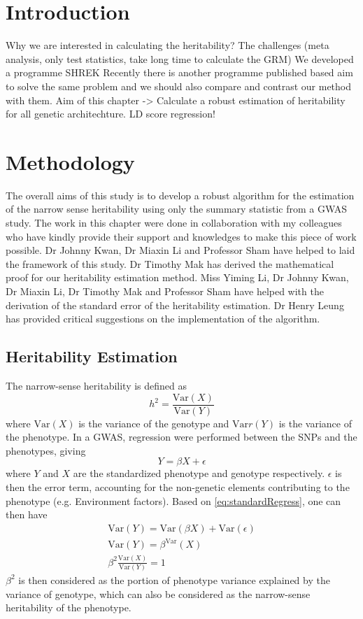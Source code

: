 	\section{Introduction}
	Why we are interested in calculating the heritability?
	The challenges (meta analysis, only test statistics, take long time to calculate the GRM)
	We developed a programme SHREK
	Recently there is another programme published based aim to solve the same problem and we should also compare and contrast our method with them.  %
	Aim of this chapter -> Calculate a robust estimation of heritability for all genetic architechture. 
	LD score regression!
	\section{Methodology}	
		The overall aims of this study is to develop a robust algorithm for the estimation of the narrow sense heritability using only the summary statistic from a \gls{GWAS} study. The work in this chapter were done in collaboration with my colleagues who have kindly provide their support and knowledges to make this piece of work possible.
		Dr Johnny Kwan, Dr Miaxin Li and Professor Sham have helped to laid the framework of this study. Dr Timothy Mak has derived the mathematical proof for our heritability estimation method. Miss Yiming Li, Dr Johnny Kwan, Dr Miaxin Li, Dr Timothy Mak and Professor Sham have helped with the derivation of the standard error of the heritability estimation. Dr Henry Leung has provided critical suggestions on the implementation of the algorithm.
		\subsection{Heritability Estimation}
			The narrow-sense heritability is defined as 
			$$
				h^2 = \frac{\mathrm{Var}(X)}{\mathrm{Var}(Y)}
			$$
			where $\mathrm{Var}(X)$ is the variance of the genotype and $\mathrm{Var}r(Y)$ is the variance of the phenotype.
			In a \gls{GWAS}, regression were performed between the \glspl{SNP} and the phenotypes, giving
			\begin{equation}
				Y=\beta X+\epsilon
				\label{eq:standardRegress}
			\end{equation}
			where $Y$ and $X$ are the standardized phenotype and genotype respectively. 
			$\epsilon$ is then the error term, accounting for the non-genetic elements contributing to the phenotype (e.g. Environment factors).
			Based on \cref{eq:standardRegress}, one can then have
			\begin{align}
				\mathrm{Var}(Y) = \mathrm{Var}(\beta X)+ \mathrm{Var}(\epsilon) \nonumber\\
				\mathrm{Var}(Y) = \beta^\mathrm{Var}(X) \nonumber\\
				\beta^2\frac{\mathrm{Var}(X)}{\mathrm{Var}(Y)}= 1
				\label{eq:betaHeri}
			\end{align}
			$\beta^2$ is then considered as the portion of phenotype variance explained by the variance of genotype, which can also be considered as the narrow-sense heritability of the phenotype.
					
